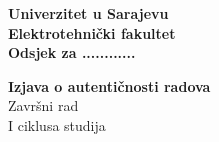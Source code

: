 
\pagebreak

\thispagestyle{plain}
\begin{flushleft}
	\textbf{Univerzitet u Sarajevu}\\
	\textbf{Elektrotehnički fakultet}\\
	\textbf{Odsjek za ............ }\\
\end{flushleft}

\begin{center}
	\vspace{1cm}
	{\Large \textbf{Izjava o autentičnosti radova}}\\
	\vspace{0.3cm}
	{\Large Završni rad}\\
	\vspace{0.2cm}
	{\Large I ciklusa studija}
	\vspace{0.5cm}
\end{center}

